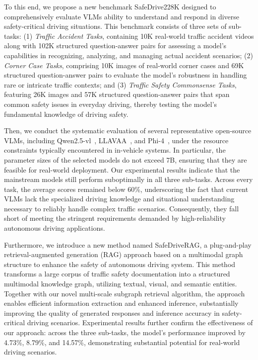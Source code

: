 \documentclass[sigconf]{acmart}
\begin{document}
To this end, we propose a new benchmark SafeDrive228K designed to comprehensively evaluate VLMs ability to understand and respond in diverse safety-critical driving situations. This benchmark consists of three sets of sub-tasks: (1) \emph{Traffic Accident Tasks}, containing 10K real-world traffic accident videos along with 102K structured question-answer pairs for assessing a model’s capabilities in recognizing, analyzing, and managing actual accident scenarios; (2) \emph{Corner Case Tasks}, comprising 10K images of real-world corner cases and 69K structured question-answer pairs to evaluate the model’s robustness in handling rare or intricate traffic contexts; and (3) \emph{Traffic Safety Commonsense Tasks}, featuring 26K images and 57K structured question-answer pairs that span common safety issues in everyday driving, thereby testing the model’s fundamental knowledge of driving safety.


Then, we conduct the systematic evaluation of several representative open-source VLMs, including Qwen2.5-vl~\cite{bai2025qwen25vl}, LLAVAA~\cite{liu2023visual}, and Phi-4~\cite{microsoft2025phi4mini}, under the resource constraints typically encountered in in-vehicle systems. In particular, the parameter sizes of the selected models do not exceed 7B, ensuring that they are feasible for real-world deployment. Our experimental results indicate that the mainstream models still perform suboptimally in all three sub-tasks. Across every task, the average scores remained below 60\%, underscoring the fact that current VLMs lack the specialized driving knowledge and situational understanding necessary to reliably handle complex traffic scenarios. Consequently, they fall short of meeting the stringent requirements demanded by high-reliability autonomous driving applications.



Furthermore, we introduce a new method named SafeDriveRAG, a plug-and-play retrieval-augmented generation (RAG) approach based on a multimodal graph structure to enhance the safety of autonomous driving system. This method transforms a large corpus of traffic safety documentation into a structured multimodal knowledge graph, utilizing textual, visual, and semantic entities. Together with our novel multi-scale subgraph retrieval algorithm, the approach enables efficient information extraction and enhanced inference, substantially improving the quality of generated responses and inference accuracy in safety-critical driving scenarios. Experimental results further confirm the effectiveness of our approach: across the three sub-tasks, the model’s performance improved by 4.73\%, 8.79\%, and 14.57\%, demonstrating substantial potential for real-world driving scenarios.
\end{document}
